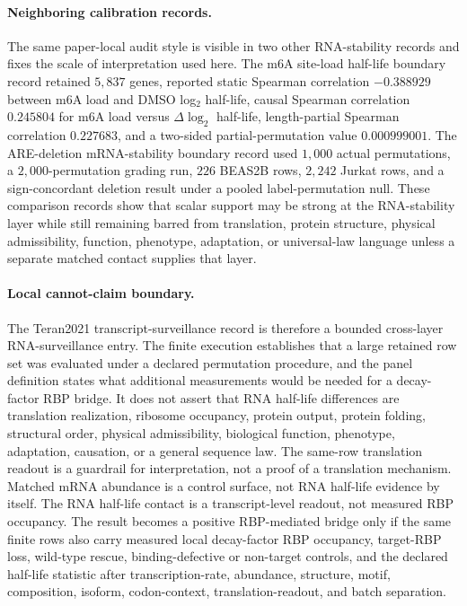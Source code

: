 \paragraph{Neighboring calibration records.}
The same paper-local audit style is visible in two other RNA-stability records and fixes the scale of interpretation used here.  The m6A site-load half-life boundary record retained $5{,}837$ genes, reported static Spearman correlation $-0.388929$ between m6A load and DMSO log$_2$ half-life, causal Spearman correlation $0.245804$ for m6A load versus $\Delta\log_2$ half-life, length-partial Spearman correlation $0.227683$, and a two-sided partial-permutation value $0.000999001$.  The ARE-deletion mRNA-stability boundary record used $1{,}000$ actual permutations, a $2{,}000$-permutation grading run, $226$ BEAS2B rows, $2{,}242$ Jurkat rows, and a sign-concordant deletion result under a pooled label-permutation null.  These comparison records show that scalar support may be strong at the RNA-stability layer while still remaining barred from translation, protein structure, physical admissibility, function, phenotype, adaptation, or universal-law language unless a separate matched contact supplies that layer.

\paragraph{Local cannot-claim boundary.}
The Teran2021 transcript-surveillance record is therefore a bounded cross-layer RNA-surveillance entry.  The finite execution establishes that a large retained row set was evaluated under a declared permutation procedure, and the panel definition states what additional measurements would be needed for a decay-factor RBP bridge.  It does not assert that RNA half-life differences are translation realization, ribosome occupancy, protein output, protein folding, structural order, physical admissibility, biological function, phenotype, adaptation, causation, or a general sequence law.  The same-row translation readout is a guardrail for interpretation, not a proof of a translation mechanism.  Matched mRNA abundance is a control surface, not RNA half-life evidence by itself.  The RNA half-life contact is a transcript-level readout, not measured RBP occupancy.  The result becomes a positive RBP-mediated bridge only if the same finite rows also carry measured local decay-factor RBP occupancy, target-RBP loss, wild-type rescue, binding-defective or non-target controls, and the declared half-life statistic after transcription-rate, abundance, structure, motif, composition, isoform, codon-context, translation-readout, and batch separation.